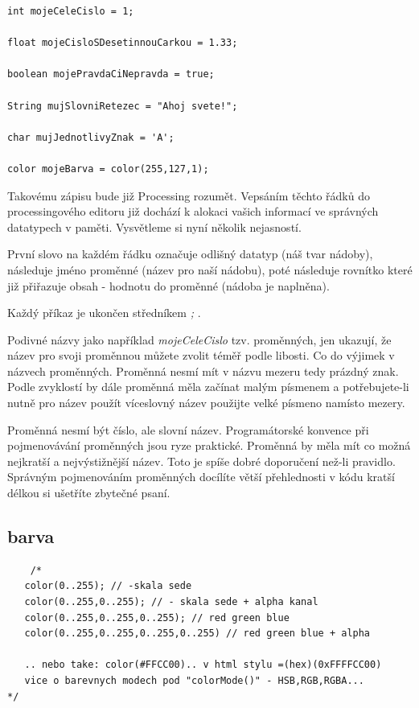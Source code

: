 \documentclass[11pt]{book}
\newcommand{\pododdil}[1]{\subsection{#1}\label{subsec:#1}}
\begin{document}
\begin{lstlisting}
int mojeCeleCislo = 1;

float mojeCisloSDesetinnouCarkou = 1.33;

boolean mojePravdaCiNepravda = true;

String mujSlovniRetezec = "Ahoj svete!";

char mujJednotlivyZnak = 'A';

color mojeBarva = color(255,127,1);

\end{lstlisting}

Takovému zápisu bude již Processing rozumět. Vepsáním těchto řádků do processingového editoru již dochází k alokaci vašich informací ve správných datatypech v paměti. Vysvětleme si nyní několik nejasností.

První slovo na každém řádku označuje odlišný datatyp (náš tvar nádoby), následuje jméno proměnné (název pro naší nádobu), poté následuje rovnítko které již přiřazuje obsah - hodnotu do proměnné (nádoba je naplněna).

Každý příkaz je ukončen středníkem {\em ;} .

Podivné názvy jako například {\em mojeCeleCislo} tzv. proměnných, jen ukazují, že název pro svoji proměnnou můžete zvolit téměř podle libosti. Co do výjimek v názvech proměnných. Proměnná nesmí mít v názvu mezeru tedy prázdný znak. Podle zvyklostí by dále proměnná měla začínat malým písmenem a potřebujete-li nutně pro název použít víceslovný název použijte velké písmeno namísto mezery.

Proměnná nesmí být číslo, ale slovní název. Programátorské konvence při pojmenovávání proměnných jsou ryze praktické. Proměnná by měla mít co možná nejkratší a nejvýstižnější název.  Toto je spíše dobré doporučení než-li pravidlo. Správným pojmenováním proměnných docílíte větší přehlednosti v kódu kratší délkou si ušetříte zbytečné psaní.


\pododdil{barva}
\begin{lstlisting}
	/*
   color(0..255); // -skala sede
   color(0..255,0..255); // - skala sede + alpha kanal
   color(0..255,0..255,0..255); // red green blue
   color(0..255,0..255,0..255,0..255) // red green blue + alpha
   
   .. nebo take: color(#FFCC00).. v html stylu =(hex)(0xFFFFCC00)
   vice o barevnych modech pod "colorMode()" - HSB,RGB,RGBA...
*/
\end{lstlisting}
\end{document}
